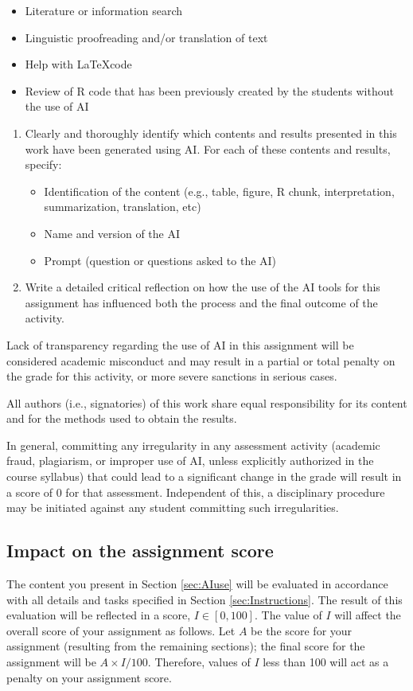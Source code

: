 \documentclass[10pt,a4paper,twoside]{article}\usepackage[]{graphicx}\usepackage[]{xcolor}
\begin{document}
\begin{itemize}
    \item Literature or information search
    \item Linguistic proofreading and/or translation of text
    \item Help with \LaTeX code
    \item Review of R code that has been previously created by the students without the use of AI
\end{itemize}
\begin{enumerate}
    \item Clearly and thoroughly identify which contents and results presented in this work have been generated using AI. For each of these contents and results, specify:
    \begin{itemize}
        \item  Identification of the content (e.g., table, figure, R chunk, interpretation, summarization, translation, etc)
        \item Name and version of the AI
        \item Prompt (question or questions asked to the AI)
    \end{itemize}
    \item Write a detailed critical reflection on how the use of the AI tools for this assignment has influenced both the process and the final outcome of the activity.
\end{enumerate}
Lack of transparency regarding the use of AI in this assignment will be considered academic misconduct and may result in a partial or total penalty on the grade for this activity, or more severe sanctions in serious cases.

All authors (i.e., signatories) of this work share equal responsibility for its content and for the methods used to obtain the results. 

In general, committing any irregularity in any assessment activity (academic fraud, plagiarism, or improper use of AI, unless explicitly authorized in the course syllabus) that could lead to a significant change in the grade will result in a score of 0 for that assessment. Independent of this, a disciplinary procedure may be initiated against any student committing such irregularities.

\subsection{Impact on the assignment score}
The content you present in Section \ref{sec:AIuse} will be evaluated in accordance with all details and tasks specified in Section \ref{sec:Instructions}. The result of this evaluation will be reflected in a score,
$I \in [0, 100]$. The value of $I$ will affect the overall score of your assignment as follows. Let $A$ be the score for your assignment (resulting from the remaining sections); the final score for the assignment will be $A \times I/100$. Therefore, values of $I$ less than 100 will act as a
penalty on your assignment score.
\end{document}
